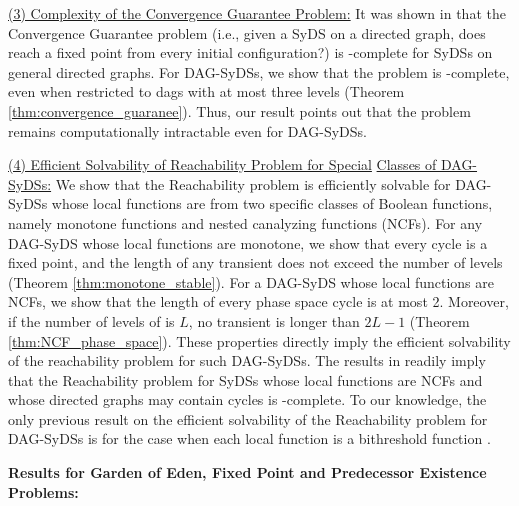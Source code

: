 \smallskip

\noindent
\underline{(3) Complexity of the Convergence Guarantee Problem:}
It was shown in \cite{Chistikov-etal-2020} that
the Convergence Guarantee problem 
(i.e., given a SyDS \cals{} on
a directed graph, does \cals{} reach a fixed point from every
initial configuration?)  
is \cpsp-complete for SyDSs on general directed graphs.
For DAG-SyDSs, we show that the problem is \cconp-complete,
even when restricted to dags with at most  three levels 
(Theorem \ref{thm:convergence_guaranee}).
Thus, our result points out that the problem remains 
computationally intractable even for DAG-SyDSs.

\smallskip

\noindent
\underline{(4) Efficient Solvability of Reachability Problem for Special}\newline
\underline{Classes of DAG-SyDSs:} 
We show that the Reachability problem is efficiently solvable for
DAG-SyDSs whose local functions are from two specific
classes of Boolean functions, namely monotone functions and
nested canalyzing functions (NCFs).
For any DAG-SyDS whose local functions are monotone,
we show that every cycle is a fixed point, 
and the length of any transient does not exceed the number of levels
(Theorem \ref{thm:monotone_stable}).
For a DAG-SyDS \cals{} whose local functions are NCFs, we show
that the length of every phase space cycle is at most 2.
Moreover, if the number of levels of  \cals{} is $L$,
no transient is longer than $2L-1$
(Theorem \ref{thm:NCF_phase_space}).
These properties
directly imply the efficient solvability of the reachability
problem for such DAG-SyDSs.
The results in \cite{Rosenkrantz-etal-2018} readily imply
that the Reachability problem for SyDSs whose local
functions are NCFs and whose directed graphs may contain cycles  
is \cpsp-complete.
To our knowledge, the only previous result on the efficient
solvability of the  Reachability problem for DAG-SyDSs is
for the case when each local function is a bithreshold
function \cite{KKM+2013}.


\iffalse
\item \textbf{Results for Garden of Eden, Fixed Point and Predecessor Existence
Problems:}

